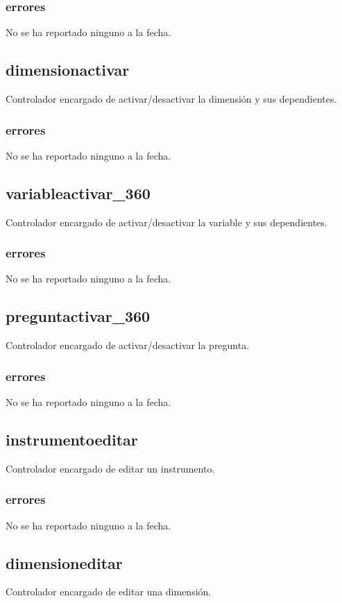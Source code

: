 \documentclass[10pt,a4paper]{book}
\begin{document}
	\subsubsection{errores}
	No se ha reportado ninguno a la fecha.

	\subsection{dimensionactivar}
	Controlador encargado de activar/desactivar la dimensión y sus dependientes.
	\subsubsection{errores}
	No se ha reportado ninguno a la fecha.

	\subsection{variableactivar\_360}
	Controlador encargado de activar/desactivar la variable y sus dependientes.
	\subsubsection{errores}
	No se ha reportado ninguno a la fecha.

	\subsection{preguntactivar\_360}
	Controlador encargado de activar/desactivar la pregunta.
	\subsubsection{errores}
	No se ha reportado ninguno a la fecha.

	\subsection{instrumentoeditar}
	Controlador encargado de editar un instrumento.
	\subsubsection{errores}
	No se ha reportado ninguno a la fecha.

	\subsection{dimensioneditar}
	Controlador encargado de editar una dimensión.
\end{document}
